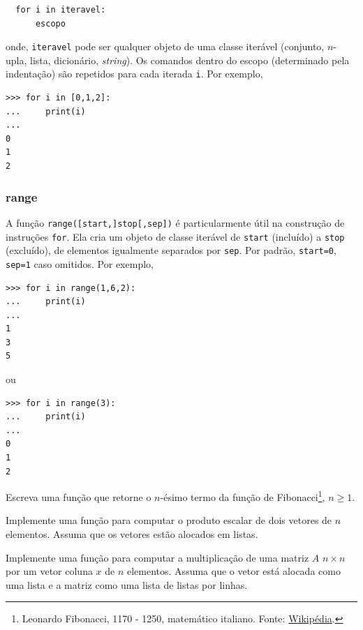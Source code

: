\documentclass[12pt]{article}
\begin{document}
\begin{lstlisting}
  for i in iteravel:
      escopo
\end{lstlisting}

onde, \lstinline+iteravel+ pode ser qualquer objeto de uma classe iterável (conjunto, $n$-upla, lista, dicionário, {\it string}). Os comandos dentro do escopo (determinado pela indentação) são repetidos para cada iterada \lstinline+i+. Por exemplo,

\begin{lstlisting}
>>> for i in [0,1,2]:
...     print(i)
... 
0
1
2
\end{lstlisting}

\subsubsection{range}

A função {\python} \lstinline+range([start,]stop[,sep])+ é particularmente útil na construção de instruções \lstinline+for+. Ela cria um objeto de classe iterável de \lstinline+start+ (incluído) a \lstinline+stop+ (excluído), de elementos igualmente separados por \lstinline+sep+. Por padrão, \lstinline+start=0+, \lstinline+sep=1+ caso omitidos. Por exemplo,

\begin{lstlisting}
>>> for i in range(1,6,2):
...     print(i)
... 
1
3
5
\end{lstlisting}

ou

\begin{lstlisting}
>>> for i in range(3):
...     print(i)
... 
0
1
2
\end{lstlisting}

\begin{exr}
  Escreva uma função que retorne o $n$-ésimo termo da função de Fibonacci\footnote{Leonardo Fibonacci, 1170 - 1250, matemático italiano. Fonte: \href{https://pt.wikipedia.org/wiki/Leonardo\_Fibonacci}{Wikipédia}.}, $n\geq 1$. 
\end{exr}

\begin{exr}
  Implemente uma função para computar o produto escalar de dois vetores de $n$ elementos. Assuma que os vetores estão alocados em listas.
\end{exr}

\begin{exr}
  Implemente uma função para computar a multiplicação de uma matriz $A$ $n\times n$ por um vetor coluna $x$ de $n$ elementos. Assuma que o vetor está alocada como uma lista e a matriz como uma lista de listas por linhas.
\end{exr}
\end{document}
